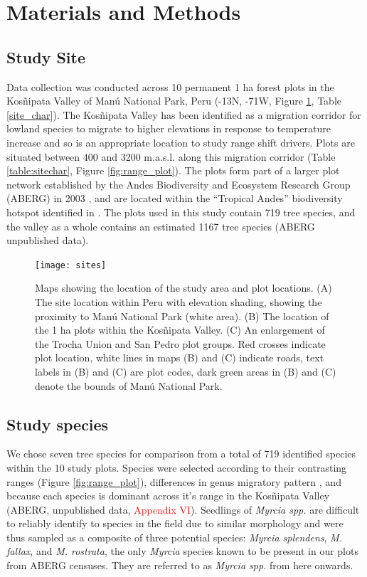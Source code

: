 \documentclass[a4paper, 11pt]{article}
\newcommand{\todo}[1]{\textcolor{red}{#1}}   %
\begin{document}
\section{Materials and Methods}
\subsection{Study Site}
Data collection was conducted across 10 permanent 1 ha forest plots in the Kos\~{n}ipata Valley of Man\'{u} National Park, Peru (-13\textdegree N, -71\textdegree W, Figure \ref{fig:sites}, Table \ref{site_char}). The Kos\~{n}ipata Valley has been identified as a migration corridor for lowland species to migrate to higher elevations in response to temperature increase \citep{Feeley2011} and so is an appropriate location to study range shift drivers. Plots are situated between 400 and 3200 m.a.s.l. along this migration corridor (Table \ref{table:sitechar}, Figure \ref{fig:range_plot}). The plots form part of a larger plot network established by the Andes Biodiversity and Ecosystem Research Group (ABERG) in 2003 \citep{Malhi2010, Girardin2014}, and are located within the ``Tropical Andes'' biodiversity hotspot identified in \citet{Myers2000}. The plots used in this study contain 719 tree species, and the valley as a whole contains an estimated 1167 tree species (ABERG unpublished data).

\begin{figure}[H]
\texttt{[image: sites]}
\centering
\caption{Maps showing the location of the study area and plot locations. (A) The site location within Peru with elevation shading, showing the proximity to Man\'{u} National Park (white area). (B) The location of the 1 ha plots within the Kos\~{n}ipata Valley. (C) An enlargement of the Trocha Union and San Pedro plot groups. Red crosses indicate plot location, white lines in maps (B) and (C) indicate roads, text labels in (B) and (C) are plot codes, dark green areas in (B) and (C) denote the bounds of Man\'{u} National Park.}
\label{fig:sites}
\end{figure}



\subsection{Study species} 
We chose seven tree species for comparison from a total of 719 identified species within the 10 study plots. Species were selected according to their contrasting ranges (Figure \ref{fig:range_plot}), differences in genus migratory pattern \citep{Feeley2011}, and because each species is dominant across it's range in the Kos\~{n}ipata Valley (ABERG, unpublished data, \todo{Appendix VI}). Seedlings of \textit{Myrcia spp.} are difficult to reliably identify to species in the field due to similar morphology and were thus sampled as a composite of three potential species: \textit{Myrcia splendens}, \textit{M. fallax}, and \textit{M. rostrata}, the only \textit{Myrcia} species known to be present in our plots from ABERG censuses. They are referred to as \textit{Myrcia spp.} from here onwards. 
\end{document}
